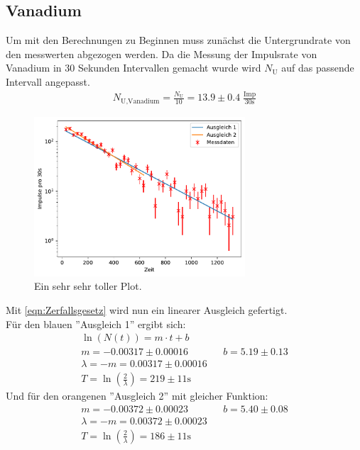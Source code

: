 \subsection{Vanadium}
Um mit den Berechnungen zu Beginnen muss zunächst die Untergrundrate von den messwerten abgezogen werden.
Da die Messung der Impulsrate von Vanadium in 30 Sekunden Intervallen gemacht wurde wird $N_{\text{U}}$ auf das passende Intervall angepasst.
\begin{align*}
    N_{\text{U},\text{Vanadium}} =  \frac{N_{\text{U}}}{10} = 13.9 \pm 0.4 \; \frac{\text{Imp}}{30\text{s}}
\end{align*}
\begin{figure}
    \centering
    \includegraphics[width=0.7\textwidth]{plots/Vanadium.pdf}
    \caption{Ein sehr sehr toller Plot.}
\end{figure}
Mit \ref{eqn:Zerfallsgesetz} wird nun ein linearer Ausgleich gefertigt. \\
Für den blauen ''Ausgleich 1'' ergibt sich:
\begin{align*}
    \ln(N(t)) = m \cdot t + b\\
     m = -0.00317 \pm 0.00016 && b = 5.19 \pm 0.13 \\
    \lambda = -m = 0.00317 \pm 0.00016 \\
    T = \ln\left( \frac{2}{\lambda} \right) = 219 \pm 11 \text{s}
\end{align*}
Und für den orangenen ''Ausgleich 2'' mit gleicher Funktion:
\begin{align*}
     m = -0.00372 \pm 0.00023 && b = 5.40 \pm 0.08 \\
    \lambda = -m = 0.00372 \pm 0.00023 \\
    T = \ln\left( \frac{2}{\lambda} \right) = 186 \pm 11 \text{s}
\end{align*}


